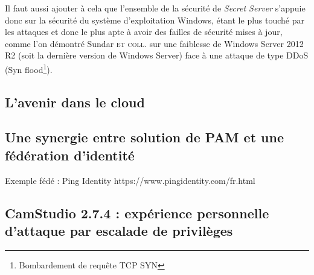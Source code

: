 Il faut aussi ajouter à cela que l'ensemble de la sécurité de \emph{Secret Server} s'appuie donc sur la sécurité du système d'exploitation Windows, étant le plus touché par les attaques et donc le plus apte à avoir des failles de sécurité mises à jour, comme l'on démontré Sundar \textsc{et coll.}\cite{skk} sur une faiblesse de Windows Server 2012 R2 (soit la dernière version de Windows Server) face à une attaque de type DDoS (Syn flood\footnote{Bombardement de requête TCP SYN}).

\subsection{L'avenir dans le cloud}
\label{subsec:avenircloud}

\subsection{Une synergie entre solution de PAM et une fédération d'identité}
\label{subsec:syner}

Exemple fédé : Ping Identity https://www.pingidentity.com/fr.html

\subsection{CamStudio 2.7.4 : expérience personnelle d'attaque par escalade de privilèges}
\label{subsec:camstudio}

